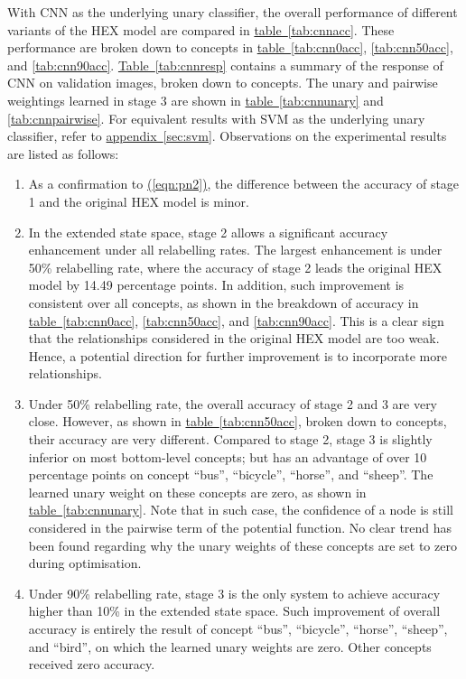 \documentclass[11pt,a4paper]{book}
\begin{document}
With CNN as the underlying unary classifier, the overall performance of different variants of the HEX model are compared in \hyperref[tab:cnnacc]{table~\ref{tab:cnnacc}}. These performance are broken down to concepts in \hyperref[tab:cnn0acc]{table~\ref{tab:cnn0acc}}, \ref{tab:cnn50acc}, and \ref{tab:cnn90acc}. \hyperref[tab:cnnresp]{Table~\ref{tab:cnnresp}} contains a summary of the response of CNN on validation images, broken down to concepts. The unary and pairwise weightings learned in stage 3 are shown in \hyperref[tab:cnnunary]{table~\ref{tab:cnnunary}} and \ref{tab:cnnpairwise}. For equivalent results with SVM as the underlying unary classifier, refer to \hyperref[sec:svm]{appendix~\ref{sec:svm}}. Observations on the experimental results are listed as follows:
\begin{enumerate}
\item As a confirmation to \hyperref[eqn:pn2]{(\ref{eqn:pn2})}, the difference between the accuracy of stage 1 and the original HEX model is minor.
\item In the extended state space, stage 2 allows a significant accuracy enhancement under all relabelling rates. The largest enhancement is under 50\% relabelling rate, where the accuracy of stage 2 leads the original HEX model by 14.49 percentage points. In addition, such improvement is consistent over all concepts, as shown in the breakdown of accuracy in \hyperref[tab:cnn0acc]{table~\ref{tab:cnn0acc}}, \ref{tab:cnn50acc}, and \ref{tab:cnn90acc}. This is a clear sign that the relationships considered in the original HEX model are too weak. Hence, a potential direction for further improvement is to incorporate more relationships.
\item Under 50\% relabelling rate, the overall accuracy of stage 2 and 3 are very close. However, as shown in \hyperref[tab:cnn0acc]{table~\ref{tab:cnn50acc}}, broken down to concepts, their accuracy are very different. Compared to stage 2, stage 3 is slightly inferior on most bottom-level concepts; but has an advantage of over 10 percentage points on concept ``bus'', ``bicycle'', ``horse'', and ``sheep''. The learned unary weight on these concepts are zero, as shown in \hyperref[tab:cnnunary]{table~\ref{tab:cnnunary}}. Note that in such case, the confidence of a node is still considered in the pairwise term of the potential function. No clear trend has been found regarding why the unary weights of these concepts are set to zero during optimisation.
\item Under 90\% relabelling rate, stage 3 is the only system to achieve accuracy higher than 10\% in the extended state space. Such improvement of overall accuracy is entirely the result of concept ``bus'', ``bicycle'', ``horse'', ``sheep'', and ``bird'', on which the learned unary weights are zero. Other concepts received zero accuracy.
\end{enumerate}
\end{document}
